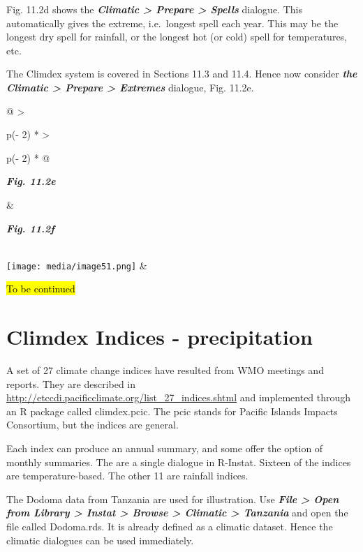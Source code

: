 \documentclass[
  letterpaper,
  DIV=11,
  numbers=noendperiod]{scrreprt}
\begin{document}
Fig. 11.2d shows the \textbf{\emph{Climatic \textgreater{} Prepare
\textgreater{} Spells}} dialogue. This automatically gives the extreme,
i.e.~longest spell each year. This may be the longest dry spell for
rainfall, or the longest hot (or cold) spell for temperatures, etc.

The Climdex system is covered in Sections 11.3 and 11.4. Hence now
consider \textbf{\emph{the Climatic \textgreater{} Prepare
\textgreater{} Extremes}} dialogue, Fig. 11.2e.

\begin{longtable}[]{@{}
  >{\raggedright\arraybackslash}p{(\columnwidth - 2\tabcolsep) * }
  >{\raggedright\arraybackslash}p{(\columnwidth - 2\tabcolsep) * }@{}}
\toprule\noalign{}
\begin{minipage}[b]{\linewidth}\raggedright
\textbf{\emph{Fig. 11.2e}}
\end{minipage} & \begin{minipage}[b]{\linewidth}\raggedright
\textbf{\emph{Fig. 11.2f}}
\end{minipage} \\
\midrule\noalign{}
\endhead
\bottomrule\noalign{}
\endlastfoot
\texttt{[image: media/image51.png]}
& \\
\end{longtable}

\hl{To be continued}

\section{Climdex Indices -
precipitation}\label{climdex-indices---precipitation}

A set of 27 climate change indices have resulted from WMO meetings and
reports. They are described in
\href{http://etccdi.pacificclimate.org/list_27_indices.shtml}{\ul{http://etccdi.pacificclimate.org/list\_27\_indices.shtml}}
and implemented through an R package called climdex.pcic. The pcic
stands for Pacific Islands Impacts Consortium, but the indices are
general.

Each index can produce an annual summary, and some offer the option of
monthly summaries. The are a single dialogue in R-Instat. Sixteen of the
indices are temperature-based. The other 11 are rainfall indices.

The Dodoma data from Tanzania are used for illustration. Use
\textbf{\emph{File \textgreater{} Open from Library \textgreater{}
Instat \textgreater{} Browse \textgreater{} Climatic \textgreater{}
Tanzania}} and open the file called Dodoma.rds. It is already defined as
a climatic dataset. Hence the climatic dialogues can be used
immediately.
\end{document}
